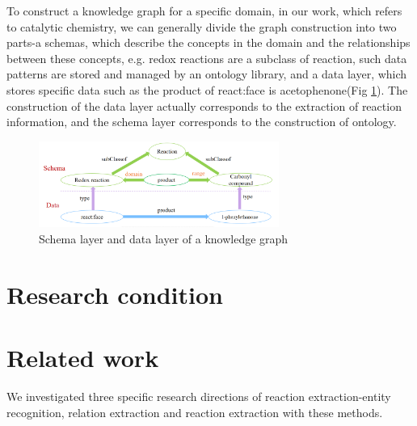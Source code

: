 \documentclass[%
 aip,
 jmp,%
 amsmath,amssymb,
 reprint,%
]{revtex4-2}
\begin{document}
To construct a knowledge graph for a specific domain, in our work, which refers to catalytic chemistry, 
we can generally divide the graph construction into two parts-a schemas, which describe the concepts in the domain and the relationships 
between these concepts, e.g. redox reactions are a subclass of reaction, such data patterns are stored and 
managed by an ontology library, and a data layer, which stores specific data such as the 
product of react:face is acetophenone(Fig \ref{ Fig.3 }). The construction of the data layer actually 
corresponds to the extraction of reaction information, and the schema layer corresponds 
to the construction of ontology\cite{eibeck2019j}. 

\begin{figure}[htbp]
 \centering
 \includegraphics[width=0.7\textwidth]{figure/3.png}
 \caption{ Schema layer and data layer of a knowledge graph }
 \label{ Fig.3 }
\end{figure}

\section{Research condition}




\section{Related work}
We investigated three specific research directions of reaction extraction-entity recognition, relation extraction
and reaction extraction with these methods.
\end{document}

